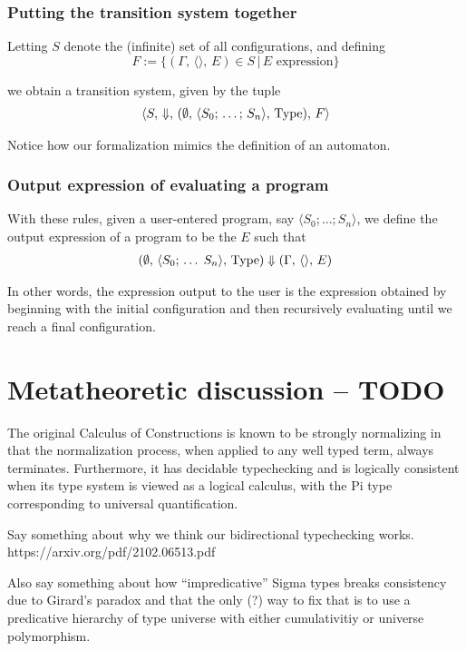\documentclass{article}
\begin{document}
\subsubsection{Putting the transition system together}
Letting $S$ denote the (infinite) set of all configurations, and defining
\[ F := \{ (\Gamma, \, \langle \rangle, \, E) \in S \, | \, E \text{ expression} \} \]

we obtain a transition system, given by the tuple
\begin{align*}
  \langle S, \, \Downarrow, \, 
  (\emptyset, \, \langle S_0; \, \dots; \, S_n \rangle, \, \operatorname{Type}), \, F \rangle
\end{align*}

Notice how our formalization mimics the definition of an automaton.

\subsubsection{Output expression of evaluating a program}
With these rules, given a user-entered program, say $\langle S_0;
\dots; S_n \rangle$, we define the
output expression of a program to be the $E$ such that
\begin{align*}
  (\emptyset, \, \langle S_0; \, \dots \; S_n \rangle, \, \operatorname{Type}) \Downarrow
  (\Gamma, \, \langle \rangle, \, E)
\end{align*}

In other words, the expression output to the user is the expression obtained by
beginning with the initial configuration and then recursively evaluating
until we reach a final configuration.

\section{Metatheoretic discussion -- TODO}
The original Calculus of Constructions is known to be strongly normalizing in
that the normalization process, when applied to any well typed term, always
terminates. Furthermore, it has decidable typechecking and is logically
consistent when its type system is viewed as a logical calculus, with the Pi type
corresponding to universal quantification.


Say something about why we think our bidirectional typechecking works.
https://arxiv.org/pdf/2102.06513.pdf

Also say something about how ``impredicative'' Sigma types breaks consistency
due to Girard's paradox and that the only (?) way to fix that is to use a 
predicative hierarchy of type universe with either cumulativitiy or universe
polymorphism.
\end{document}
